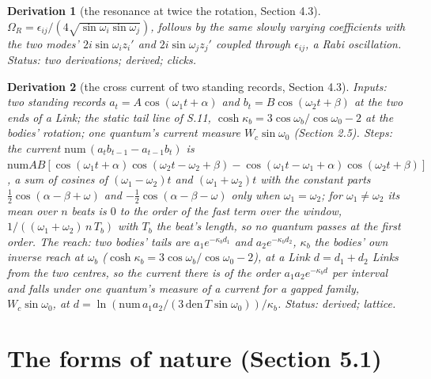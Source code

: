 \documentclass[pdflatex,sn-mathphys-num]{sn-jnl}
\newcommand{\num}{\mathrm{num}}
\newcommand{\den}{\mathrm{den}}
\newcommand{\Wc}{W_c}
\theoremstyle{thmstyleone}
\newtheorem{derivation}{Derivation}
\begin{document}
\begin{derivation}[the resonance at twice the rotation, Section 4.3]
$\Omega_R = \epsilon_{ij} / (4\sqrt{\sin\omega_i\sin\omega_j})$, follows by the same slowly varying coefficients with the two modes' $2i\sin\omega_i z_i'$ and $2i\sin\omega_j z_j'$ coupled through $\epsilon_{ij}$, a Rabi oscillation.
 \emph{Status:} two derivations; derived; clicks.
\end{derivation}

\begin{derivation}[the cross current of two standing records, Section 4.3]
\emph{Inputs:} two standing records $a_t = A\cos(\omega_1 t + \alpha)$ and $b_t = B\cos(\omega_2 t + \beta)$ at the two ends of a Link; the static tail line of S.11, $\cosh\kappa_b = 3\cos\omega_b / \cos\omega_0 - 2$ at the bodies' rotation; one quantum's current measure $W_c\sin\omega_0$ (Section 2.5). \emph{Steps:} the current $\num\,(a_t b_{t-1} - a_{t-1} b_t)$ is $\num AB[\cos(\omega_1 t + \alpha)\cos(\omega_2 t - \omega_2 + \beta) - \cos(\omega_1 t - \omega_1 + \alpha)\cos(\omega_2 t + \beta)]$, a sum of cosines of $(\omega_1 - \omega_2)t$ and $(\omega_1 + \omega_2)t$ with the constant parts $\frac{1}{2}\cos(\alpha - \beta + \omega)$ and $-\frac{1}{2}\cos(\alpha - \beta - \omega)$ only when $\omega_1 = \omega_2$; for $\omega_1 \ne \omega_2$ its mean over $n$ beats is $0$ to the order of the fast term over the window, $1 / ((\omega_1 + \omega_2)\,n\,T_b)$ with $T_b$ the beat's length, so no quantum passes at the first order. \emph{The reach:} two bodies' tails are $a_1 e^{-\kappa_b d_1}$ and $a_2 e^{-\kappa_b d_2}$, $\kappa_b$ the bodies' own inverse reach at $\omega_b$ ($\cosh\kappa_b = 3\cos\omega_b / \cos\omega_0 - 2$), at a Link $d = d_1 + d_2$ Links from the two centres, so the current there is of the order $a_1 a_2 e^{-\kappa_b d}$ per interval and falls under one quantum's measure of a current for a gapped family, $\Wc\sin\omega_0$, at $d = \ln(\num\,a_1 a_2 / (3\,\den\,T\sin\omega_0)) / \kappa_b$.
 \emph{Status:} derived; lattice.
\end{derivation}

\section*{The forms of nature (Section 5.1)}
\end{document}
